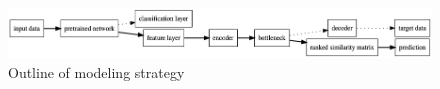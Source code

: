 \begin{figure}[H]
    \centering
    \includegraphics[scale=0.35]{pictures/graphviz/project}
    \caption{Outline of modeling strategy}
    \label{fig:strategy}
\end{figure}


